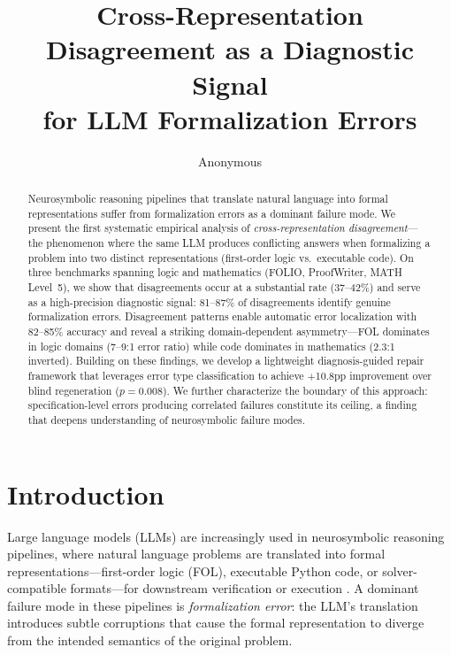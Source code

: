 \documentclass[11pt,a4paper]{article}
\title{Cross-Representation Disagreement as a Diagnostic Signal\\for LLM Formalization Errors}
\author{Anonymous}
\begin{document}
\maketitle

\begin{abstract}
Neurosymbolic reasoning pipelines that translate natural language into formal representations suffer from formalization errors as a dominant failure mode. We present the first systematic empirical analysis of \emph{cross-representation disagreement}---the phenomenon where the same LLM produces conflicting answers when formalizing a problem into two distinct representations (first-order logic vs.\ executable code). On three benchmarks spanning logic and mathematics (FOLIO, ProofWriter, MATH Level~5), we show that disagreements occur at a substantial rate (37--42\%) and serve as a high-precision diagnostic signal: 81--87\% of disagreements identify genuine formalization errors. Disagreement patterns enable automatic error localization with 82--85\% accuracy and reveal a striking domain-dependent asymmetry---FOL dominates in logic domains (7--9:1 error ratio) while code dominates in mathematics (2.3:1 inverted). Building on these findings, we develop a lightweight diagnosis-guided repair framework that leverages error type classification to achieve +10.8pp improvement over blind regeneration ($p=0.008$). We further characterize the boundary of this approach: specification-level errors producing correlated failures constitute its ceiling, a finding that deepens understanding of neurosymbolic failure modes.
\end{abstract}

\section{Introduction}
\label{sec:intro}

Large language models (LLMs) are increasingly used in neurosymbolic reasoning pipelines, where natural language problems are translated into formal representations---first-order logic (FOL), executable Python code, or solver-compatible formats---for downstream verification or execution \cite{pan2023logic,ye2024satlm}. A dominant failure mode in these pipelines is \emph{formalization error}: the LLM's translation introduces subtle corruptions that cause the formal representation to diverge from the intended semantics of the original problem.
\end{document}
